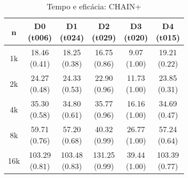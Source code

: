 \begin{table}[h]
    \centering
    \caption{Tempo e eficácia: CHAIN+\label{results-chain-1}}
    \begin{tabular}{cccccc}
        \toprule
        n & \makecell{D0 \\ (t006)} & \makecell{D1 \\ (t024)} & \makecell{D2 \\ (t029)} & \makecell{D3 \\ (t020)} & \makecell{D4 \\ (t015)}\\ \midrule
        1k & \specialcell{18.46 \\ (0.41)} & \specialcell{18.25 \\ (0.38)} & \specialcell{16.75 \\ (0.86)} & \specialcell{9.07 \\ (1.00)} & \specialcell{19.21 \\ (0.22)}\\ \midrule
        2k & \specialcell{24.27 \\ (0.48)} & \specialcell{24.33 \\ (0.53)} & \specialcell{22.90 \\ (0.96)} & \specialcell{11.73 \\ (1.00)} & \specialcell{23.85 \\ (0.31)}\\ \midrule
        4k & \specialcell{35.30 \\ (0.58)} & \specialcell{34.80 \\ (0.61)} & \specialcell{35.77 \\ (0.96)} & \specialcell{16.16 \\ (1.00)} & \specialcell{34.69 \\ (0.47)}\\ \midrule
        8k & \specialcell{59.71 \\ (0.76)} & \specialcell{57.20 \\ (0.68)} & \specialcell{40.32 \\ (0.99)} & \specialcell{26.77 \\ (1.00)} & \specialcell{57.24 \\ (0.64)}\\ \midrule
        16k & \specialcell{103.29 \\ (0.81)} & \specialcell{103.48 \\ (0.83)} & \specialcell{131.25 \\ (0.99)} & \specialcell{39.44 \\ (1.00)} & \specialcell{103.39 \\ (0.77)}\\ \bottomrule
    \end{tabular}
\end{table}
